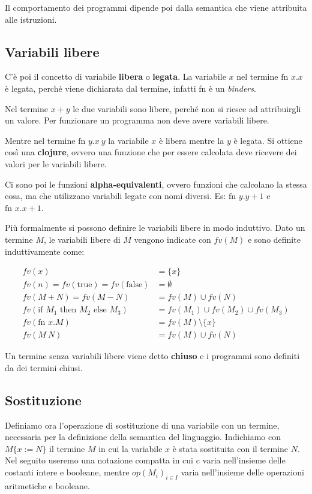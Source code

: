 Il comportamento dei programmi dipende poi dalla semantica che viene attribuita alle istruzioni.

\subsection{Variabili libere}

C'è poi il concetto di variabile \textbf{libera} o \textbf{legata}.
La variabile $x$ nel termine $\text{fn } x.x$ è legata, perché viene dichiarata dal termine, infatti fn è un \textit{binders}.

Nel termine $x+y$ le due variabili sono libere, perché non si riesce ad attribuirgli un valore. Per funzionare un programma non deve avere variabili libere.

Mentre nel termine $\text{fn }y. x\: y$ la variabile $x$ è libera mentre la $y$ è legata. Si ottiene così una \textbf{clojure}, ovvero una funzione che per essere calcolata deve ricevere dei valori per le variabili libere.

Ci sono poi le funzioni \textbf{alpha-equivalenti}, ovvero funzioni che calcolano la stessa cosa, ma che utilizzano variabili legate con nomi diversi. Es: $\text{fn }y.y+1$ e $\text{fn }x.x+1$.

Più formalmente si possono definire le variabili libere in modo induttivo.
Dato un termine $M$, le variabili libere di $M$ vengono indicate con $fv(M)$ e sono definite induttivamente come:

\begin{align*}
	fv(x) &= \{ x \} \\
	fv(n) =fv(\text{true}) = fv(\text{false}) &= \emptyset \\
	fv(M + N) = fv(M-N) &= fv(M) \cup fv(N) \\
	fv(\text{if } M_1 \text{ then } M_2 \text{ else }M_3) &= fv(M_1) \cup fv(M_2) \cup fv(M_3) \\
	fv(\text{fn }x.M) &= fv(M) \setminus \{x\} \\
	fv(M \: N) &= fv(M) \cup fv(N)
\end{align*}

Un termine senza variabili libere viene detto \textbf{chiuso} e i programmi sono definiti da dei termini chiusi.

\subsection{Sostituzione}

Definiamo ora l’operazione di sostituzione di una variabile con un termine, necessaria per la definizione della semantica del linguaggio. 
Indichiamo con $M \{x := N\}$ il termine $M$ in cui la variabile $x$ è stata sostituita con il termine $N$.
Nel seguito useremo una notazione compatta in cui c varia nell’insieme delle costanti intere e booleane, mentre $op(M_i)_{i\in I}$ varia nell’insieme delle operazioni aritmetiche e booleane.

